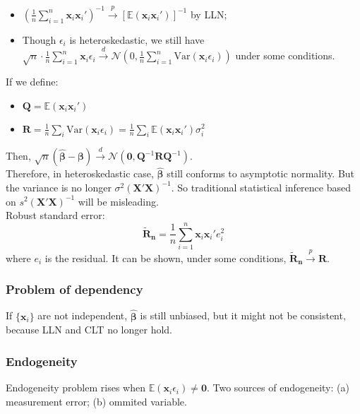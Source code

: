 \documentclass[%
 aip,
 jmp,%
 amsmath,amssymb,
 reprint,%
]{revtex4-1}
\def\N{{\mathbb N}}
\def\b{\beta}
\def\e{\epsilon}
\def\s{\sigma}
\def\E{\mathbb{E}}
\def\N{\mathcal{N}} %
\def\Var{\mathrm{Var}}
\def\pto{\overset{p}{\to}}
\def\dto{\overset{d}{\to}}
\def\asim{\overset{a}{\sim}}
\def\h{\hat}
\def\t{\tilde}
\def\l{\left}
\def\r{\right}
\newcommand{\mean}[1]{\frac{1}{n}\sum_{i=1}^{n} #1}
\newcommand{\mat}[1]{\bm{#1}}
\renewcommand{\vec}[1]{\bm{#1}}
\begin{document}
\begin{itemize}
    \item $\l(\mean \vec x_i \vec x_i'\r)^{-1} \pto [\E(\vec x_i \vec x_i')]^{-1}$ by LLN;
    \item Though $\e_i$ is heteroskedastic, we still have $\sqrt{n}\cdot\mean \vec x_i \e_i \dto \N(0, \mean \Var{(\vec x_i\e_i)})$ under some conditions.
\end{itemize}

If we define:
\begin{itemize}
    \item $\mat Q = \E(\vec x_i \vec x_i')$
    \item $\mat R = \frac{1}{n}\sum_i\Var{(\vec x_i\e_i)} = \frac{1}{n}\sum_i\E(\vec x_i\vec x_i')\s_i^2$
\end{itemize}
Then, $\sqrt{n}(\vec{\h\b} - \vec{\b}) \dto \N(\vec 0, \mat Q^{-1} \mat R \mat Q^{-1})$.\\


Therefore, in heteroskedastic case, $\vec{\h\b}$ still conforms to asymptotic normality. But the variance is no longer $\s^2 (\mat X'\mat X)^{-1}$.
So traditional  statistical inference based on $s^2(\mat X'\mat X)^{-1}$
will be misleading. \\

Robust standard error:
$$ \vec{\t R_n} = \mean \vec x_i \vec x_i' e_i^2 $$
where $e_i$ is the residual.
It can be shown, under some conditions, $\vec{\t R_n} \pto \vec{R}$.

\subsubsection{Problem of dependency}
If $\{\vec x_i\}$ are not independent, $\vec{\h\b}$ is still unbiased, but
it might not be consistent, because LLN and CLT no longer hold.

\subsubsection{Endogeneity}
Endogeneity problem rises when $\E(\vec x_i \e_i)\neq \vec 0$.
Two sources of endogeneity: (a) measurement error; (b) ommited variable.\\
\end{document}
